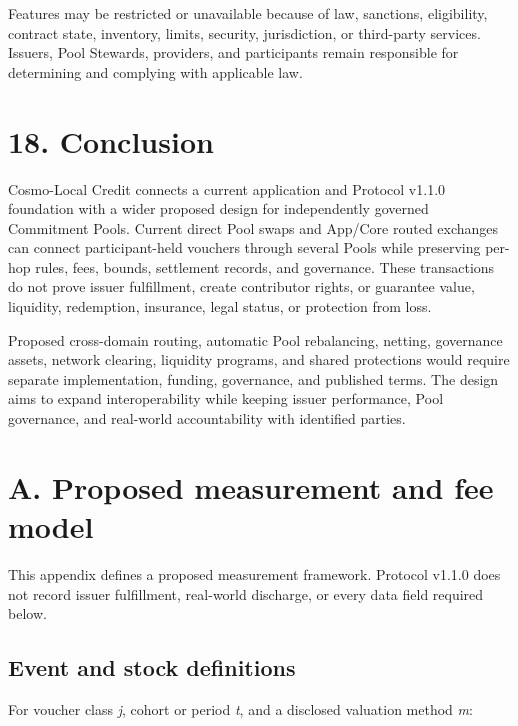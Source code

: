 \documentclass[11pt]{article}
\begin{document}
Features may be restricted or unavailable because of law, sanctions, eligibility, contract state, inventory, limits, security, jurisdiction, or third-party services. Issuers, Pool Stewards, providers, and participants remain responsible for determining and complying with applicable law.


\section*{18. Conclusion}

Cosmo-Local Credit connects a current application and Protocol v1.1.0 foundation with a wider proposed design for independently governed Commitment Pools. Current direct Pool swaps and App/Core routed exchanges can connect participant-held vouchers through several Pools while preserving per-hop rules, fees, bounds, settlement records, and governance. These transactions do not prove issuer fulfillment, create contributor rights, or guarantee value, liquidity, redemption, insurance, legal status, or protection from loss.

Proposed cross-domain routing, automatic Pool rebalancing, netting, governance assets, network clearing, liquidity programs, and shared protections would require separate implementation, funding, governance, and published terms. The design aims to expand interoperability while keeping issuer performance, Pool governance, and real-world accountability with identified parties.


\section*{A. Proposed measurement and fee model}

This appendix defines a proposed measurement framework. Protocol v1.1.0 does not record issuer fulfillment, real-world discharge, or every data field required below.

\subsection*{Event and stock definitions}

For voucher class \emph{j}, cohort or period \emph{t}, and a disclosed valuation method \emph{m}:
\end{document}

